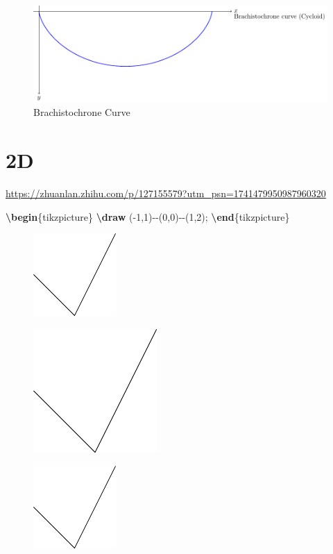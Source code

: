 \documentclass[
]{book}
\newenvironment{Shaded}{\begin{snugshade}}{\end{snugshade}}
\newcommand{\ExtensionTok}[1]{#1}
\newcommand{\FunctionTok}[1]{\textcolor[rgb]{0.13,0.29,0.53}{\textbf{#1}}}
\newcommand{\KeywordTok}[1]{\textcolor[rgb]{0.13,0.29,0.53}{\textbf{#1}}}
\newcommand{\NormalTok}[1]{#1}
\theoremstyle{definition}
\theoremstyle{definition}
\theoremstyle{definition}
\theoremstyle{definition}
\theoremstyle{remark}
\begin{document}
\begin{figure}
\includegraphics[width=0.9\linewidth]{202401311000-TikZ_files/figure-latex/unnamed-chunk-7-1} \caption{Brachistochrone Curve}\label{fig:unnamed-chunk-7}
\end{figure}

\hypertarget{d}{%
\section{2D}\label{d}}

\url{https://zhuanlan.zhihu.com/p/127155579?utm_psn=1741479950987960320}

\begin{Shaded}
\begin{Highlighting}[]
\KeywordTok{\textbackslash{}begin}\NormalTok{\{}\ExtensionTok{tikzpicture}\NormalTok{\}}
  \FunctionTok{\textbackslash{}draw}\NormalTok{ ({-}1,1){-}{-}(0,0){-}{-}(1,2);}
\KeywordTok{\textbackslash{}end}\NormalTok{\{}\ExtensionTok{tikzpicture}\NormalTok{\}}
\end{Highlighting}
\end{Shaded}

\begin{figure}
\includegraphics[width=0.05\linewidth]{202401311000-TikZ_files/figure-latex/unnamed-chunk-9-1} \end{figure}

\begin{figure}
\includegraphics[width=0.05\linewidth]{202401311000-TikZ_files/figure-latex/unnamed-chunk-10-1} \end{figure}

\begin{figure}
\includegraphics[width=0.2\linewidth]{202401311000-TikZ_files/figure-latex/unnamed-chunk-11-1} \end{figure}
\end{document}
